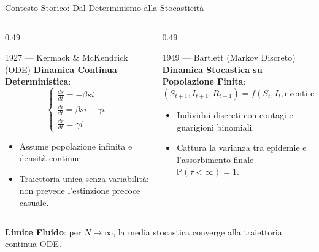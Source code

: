 \documentclass[10pt, aspectratio=169]{beamer}
\begin{document}
\begin{frame}{Contesto Storico: Dal Determinismo alla Stocasticità}
    \begin{columns}[T]
        \begin{column}{0.49\textwidth}
            \begin{block}{\footnotesize 1927 — Kermack \& McKendrick (ODE)}
                \footnotesize \textbf{Dinamica Continua Deterministica}:
                \[
                \begin{cases}
                    \frac{ds}{dt} = -\beta s i \\
                    \frac{di}{dt} = \beta s i - \gamma i \\
                    \frac{dr}{dt} = \gamma i
                \end{cases}
                \]
                \begin{itemize}
                    \item Assume popolazione infinita e densità continue.
                    \item Traiettoria unica senza variabilità: non prevede l'estinzione precoce casuale.
                \end{itemize}
            \end{block}
        \end{column}
        \begin{column}{0.49\textwidth}
            \begin{block}{\footnotesize 1949 — Bartlett (Markov Discreto)}
                \footnotesize \textbf{Dinamica Stocastica su Popolazione Finita}:
                \[
                (S_{t+1}, I_{t+1}, R_{t+1}) = f(S_t, I_t, \text{eventi casuali})
                \]
                \begin{itemize}
                    \item Individui discreti con contagi e guarigioni binomiali.
                    \item Cattura la varianza tra epidemie e l'assorbimento finale $\mathbb{P}(\tau < \infty)=1$.
                \end{itemize}
            \end{block}
        \end{column}
    \end{columns}

    \vspace{0.2cm}
    \begin{center}
        \footnotesize \textbf{Limite Fluido}: per $N \to \infty$, la media stocastica converge alla traiettoria continua ODE.
    \end{center}

\end{frame}
\end{document}
